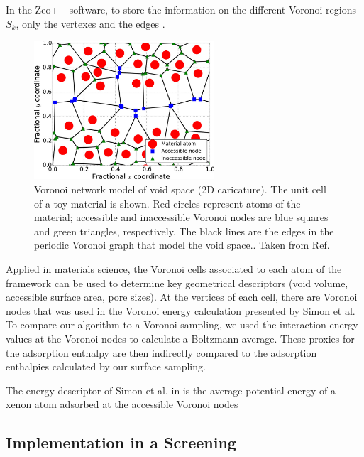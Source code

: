 \documentclass[main]{subfiles}
\begin{document}
In the Zeo++ software,\cite{Zeo++} to store the information on the different Voronoi regions $S_{k}$, only the vertexes and the edges .

\begin{figure}
  \centering
  \includegraphics[width=0.6\textwidth]{figures/3-fastsim/Simon_voronoi.jpeg}
  \caption{Voronoi network model of void space (2D caricature). The unit cell of a toy material is shown. Red circles represent atoms of the material; accessible and inaccessible Voronoi nodes are blue squares and green triangles, respectively. The black lines are the edges in the periodic Voronoi graph that model the void space.. Taken from Ref.~\cite{Simon_2015}}\label{}
\end{figure}



Applied in materials science, the Voronoi cells associated to each atom of the framework can be used to determine key geometrical descriptors (void volume, accessible surface area, pore sizes). At the vertices of each cell, there are Voronoi nodes that was used in the Voronoi energy calculation presented by Simon et al.\cite{Simon2015} To compare our algorithm to a Voronoi sampling, we used the interaction energy values at the Voronoi nodes to calculate a Boltzmann average. These proxies for the adsorption enthalpy are then indirectly compared to the adsorption enthalpies calculated by our surface sampling.

The energy descriptor of Simon et al. in  is the average potential energy of a xenon atom adsorbed at the accessible Voronoi nodes


\subsection{Implementation in a Screening}
\end{document}
